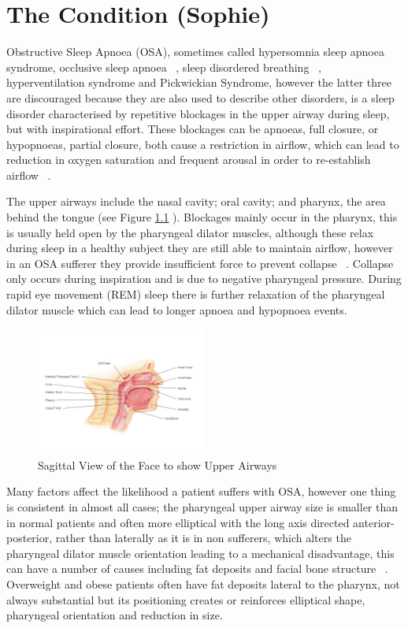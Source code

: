 \chapter{The Condition (Sophie)}
\label{ch:medicalInfo}
Obstructive Sleep Apnoea (OSA), sometimes called hypersomnia sleep apnoea syndrome, occlusive sleep apnoea ~\cite{whitelaw1993characteristics}, sleep disordered breathing ~\cite{sleepdisorderedbreathing}, hyperventilation syndrome and Pickwickian Syndrome, however the latter three are discouraged because they are also used to describe other disorders, is a sleep disorder characterised by repetitive blockages in the upper airway during sleep, but with inspirational effort. These blockages can be apnoeas, full closure, or hypopnoeas, partial closure, both cause a restriction in airflow, which can lead to reduction in oxygen saturation and frequent arousal in order to re-establish airflow ~\cite{american2001international}.

The upper airways include the nasal cavity; oral cavity; and pharynx, the area behind the tongue (see Figure \ref{fig:Sagittal-Face} ). Blockages mainly occur in the pharynx, this is usually held open by the pharyngeal dilator muscles, although these relax during sleep in a healthy subject they are still able to maintain airflow, however in an OSA sufferer they provide insufficient force to prevent collapse ~\cite{fogel2004sleep}. Collapse only occurs during inspiration and is due to negative pharyngeal pressure. During rapid eye movement (REM) sleep there is further relaxation of the pharyngeal dilator muscle which can lead to longer apnoea and hypopnoea events. 

\begin{figure}[h]
\centering
\includegraphics[width=0.5\textwidth]{drawings/Sagittal-Face}
\caption{Sagittal View of the Face to show Upper Airways ~\cite{sagittalface}}
\label{fig:Sagittal-Face}
\end{figure}
Many factors affect the likelihood a patient suffers with OSA, however one thing is consistent in almost all cases; the pharyngeal upper airway size is smaller than in normal patients and often more elliptical with the long axis directed anterior-posterior, rather than laterally as it is in non sufferers, which alters the pharyngeal dilator muscle orientation leading to a mechanical disadvantage, this can have a number of causes including fat deposits and facial bone structure ~\cite{leiter1996upper}. Overweight and obese patients often have fat deposits lateral to the pharynx, not always substantial but its positioning creates or reinforces elliptical shape, pharyngeal orientation and reduction in size. 

